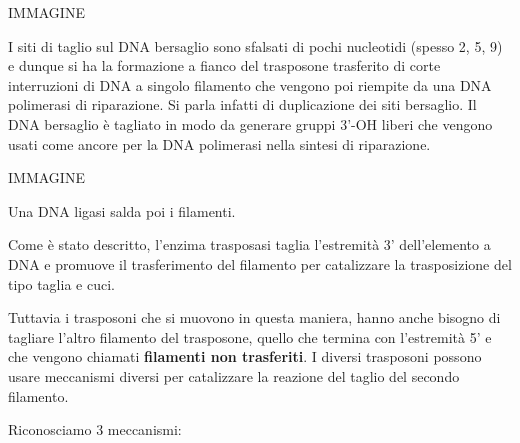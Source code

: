 \documentclass[11pt]{book}
\begin{document}
IMMAGINE

I siti di taglio sul DNA bersaglio sono sfalsati di pochi nucleotidi
(spesso 2, 5, 9) e dunque si ha la formazione a fianco del trasposone
trasferito di corte interruzioni di DNA a singolo filamento che vengono
poi riempite da una DNA polimerasi di riparazione. Si parla infatti di
duplicazione dei siti bersaglio. Il DNA bersaglio è tagliato in modo da
generare gruppi 3'-OH liberi che vengono usati come ancore per la DNA
polimerasi nella sintesi di riparazione.

IMMAGINE

Una DNA ligasi salda poi i filamenti.

Come è stato descritto, l'enzima trasposasi taglia l'estremità 3'
dell'elemento a DNA e promuove il trasferimento del filamento per
catalizzare la trasposizione del tipo taglia e cuci.

Tuttavia i trasposoni che si muovono in questa maniera, hanno anche
bisogno di tagliare l'altro filamento del trasposone, quello che termina
con l'estremità 5' e che vengono chiamati \textbf{filamenti non
trasferiti}. I diversi trasposoni possono usare meccanismi diversi per
catalizzare la reazione del taglio del secondo filamento.

Riconosciamo 3 meccanismi:
\end{document}
